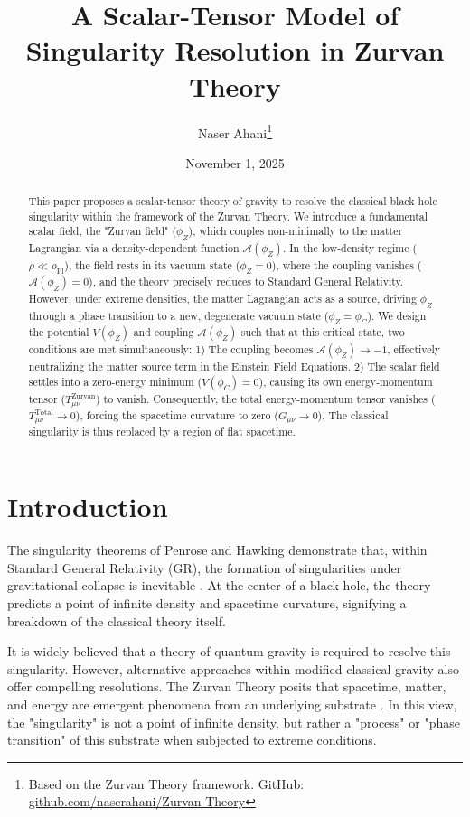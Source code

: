 \documentclass[12pt, a4paper]{article}
\title{A Scalar-Tensor Model of Singularity Resolution in Zurvan Theory}
\author{Naser Ahani\thanks{Based on the Zurvan Theory framework. GitHub: \href{https://github.com/naserahani/Zurvan-Theory}{github.com/naserahani/Zurvan-Theory}}}
\date{November 1, 2025}
\newcommand{\phiZ}{\phi_Z}
\newcommand{\Tzurvan}{T_{\mu\nu}^{\text{Zurvan}}}
\newcommand{\Ttotal}{T_{\mu\nu}^{\text{Total}}}
\newcommand{\Aphi}{\mathcal{A}(\phiZ)}
\newcommand{\phiC}{\phi_C}
\newcommand{\rhopl}{\rho_{\text{Pl}}}
\begin{document}

\maketitle

\begin{abstract}
This paper proposes a scalar-tensor theory of gravity to resolve the classical black hole singularity within the framework of the Zurvan Theory. We introduce a fundamental scalar field, the "Zurvan field" ($\phiZ$), which couples non-minimally to the matter Lagrangian via a density-dependent function $\Aphi$. In the low-density regime ($\rho \ll \rhopl$), the field rests in its vacuum state ($\phiZ=0$), where the coupling vanishes ($\Aphi=0$), and the theory precisely reduces to Standard General Relativity. However, under extreme densities, the matter Lagrangian acts as a source, driving $\phiZ$ through a phase transition to a new, degenerate vacuum state ($\phiZ = \phiC$). We design the potential $V(\phiZ)$ and coupling $\Aphi$ such that at this critical state, two conditions are met simultaneously: 1) The coupling becomes $\Aphi \to -1$, effectively neutralizing the matter source term in the Einstein Field Equations. 2) The scalar field settles into a zero-energy minimum ($V(\phiC)=0$), causing its own energy-momentum tensor ($\Tzurvan$) to vanish. Consequently, the total energy-momentum tensor vanishes ($\Ttotal \to 0$), forcing the spacetime curvature to zero ($G_{\mu\nu} \to 0$). The classical singularity is thus replaced by a region of flat spacetime.
\end{abstract}

\newpage

\section{Introduction}

The singularity theorems of Penrose and Hawking demonstrate that, within Standard General Relativity (GR), the formation of singularities under gravitational collapse is inevitable \cite{penrose1965, hawking1970}. At the center of a black hole, the theory predicts a point of infinite density and spacetime curvature, signifying a breakdown of the classical theory itself.

It is widely believed that a theory of quantum gravity is required to resolve this singularity. However, alternative approaches within modified classical gravity also offer compelling resolutions. The Zurvan Theory posits that spacetime, matter, and energy are emergent phenomena from an underlying substrate \cite{ahani_zurvan}. In this view, the "singularity" is not a point of infinite density, but rather a "process" or "phase transition" of this substrate when subjected to extreme conditions.
\end{document}
